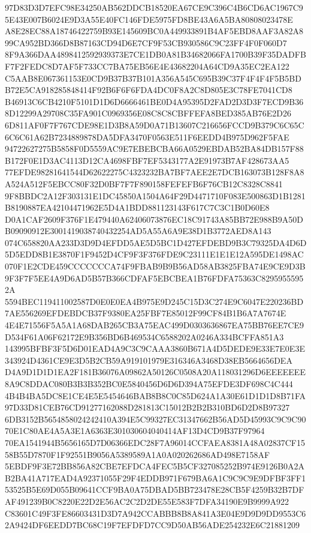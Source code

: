 \documentclass[UTF8,fontset=fandol,zihao=-4,a4paper]{ctexart}
\begin{document}
{{97D83D3D7EFC98E34250AB562DDCB18520EA67CE9C396C4B6CD6AC1967C95E43E007B6024E9D3A55E40FC146FDE5975FD8BE43A6A5BA80808023478E
A8E28EC88A18746422759B93E145609BC0A449933891B4AF5EBD8AAF3A82A899CA952BD366D8B87163CD94D6E7CF9F53CB930586C9C23FF4F0F060D7
8F9A366DAA4898412592939373E7CE1DB0A81B34682066FA1700B39F35DADFBF7F2FEDC8D7AF5F733CC7BA75EB56E4E43682204A64CD9A35EC2EA122
C5AAB8E067361153E0CD9B37B37B101A356A545C695B39C37F4F4F4F5B5BDB72E5CA918285848414F92B6F6F6FDA4DC0F8A2C8D805E3C78FE7041CD8
B46913C6CB4210F5101D1D6D6666461BE0D4A95395D2FAD2D3D3F7ECD9B368D12299A29708C35FA901C0969356E08C8C8CBFFEFA8BED385AB76E2D26
6D811AF0F7F767CDE98E1D3B8A59D0A71B13607C216656FCCD9B379C6C65C6C6C61A62B7234889878DA5DFA3470F0563E511F6EEDD4B975D962F5FAE
94722627275B5858F0D5559AC9E7EBEBCBA66A0529EBDAB52BA84DB157F88B172F0E1D3AC4113D12CA4698FBF7EF5343177A2E91973B7AF428673AA5
77EFDE98281641544D62622275C4323232BA7BF7AEE2E7DCB163073B128F8A8A524A512F5EBCC80F32D0BF7F7F890158FEFEFB6F76CB12C8328C8841
9F8BBDC2A12F303131E1DC45850A1504A64F29D4471710F083E500863D1B1281B8190887EA42104471962E5D4A1BDD881123143F617C7C3C1B0D60E8
D0A1CAF2609F376F1E479440A62406073876EC18C91743A85BB72E988B9A50DB09090912E3001419038740432254AD5A55A6A9E38D1B3772AED8A143
074C658820AA233D3D9D4EFDD5AE5D5BC1D427EFDEBD9B3C79325DA4D6D5D5EDD8B1E3870F1F9452D4CF9F3F376FDE9C23111E1E1E12A595DE1498AC
070F1E2CDE459CCCCCCCA74F9FBAB9B9B56AD58AB3825FBA74E9CE9D3B9F3F7F5EE4A9D6AD5B57B366CDFAF5EBCBEA1B76FDFA75363C82959555952A
5594BEC119411002587D0E0E0EA4B975E9D245C15D3C274E9C6047E220236BD7AE556269EFDEBDCB37F9380EA25FBF7E85012F99CF84B1B6A7A7674E
4E4E71556F5A5A1A68DAB265CB3A75EAC499D0303636867EA75BB76EE7CE9D534F61A06F62172E9B356BD6B469534C6588202A0246A334BCFFA851A3
143995BFBF3F5D6D01EAD4A9C3C9CAAA3860B671A4D5DEDE9E33E7E0E3E343924D4361CE9E3D5B2CB59A919101979E316346A3468D38EB5664656DEA
D4A9D1D1D1EA2F181B36076A09862A50126C0508A20A118031296D6EEEEEEE8A9C8DDAC080B3B3B352BC0E5840456D6D6D394A75EFDE3DF698C4C444
4B4B4BA5DC8E1CE4E5E5454646BAB8B8C0C85D624A1A30E61D1D1D8B71FA97D33D81CEB76CD91277162088D281813C15012B2B2B310BD6D2D8B97327
6DB3152B5654858024242410A394E5C99327EC31347662B56AD5D45993C9C9C9070E1C80AE4A5A3E1A6363E301030604040414AF13D4CD9B37F97964
70EA1541944B5656165D7D06366EDC28F7A96014CCFAEA8381A48A02837CF1558B55D7870F1F92551B9056A5389589A1A0A020262686AD498E7158AF
5EBDF9F3E72BB856A82CBE7EFDCA4FEC5B5CF327085252B974E9126B0A2AB2BA41A717EAD4A92371055F29F4EDDB971F679BA6A1C9C9C9E9DFBF3FF1
53525B5E69D055B09641CCF9BA0A75DBAD5BB723478E28CB5F4259B32B7DFAF491239B0C8220E22D2E56AC2C2D2DE55E583F7DFA34190E9B9999A922
C83601C49F3FE86603431D3D7A942CCABBB8B8A841A3E04E9D9D9DD9553C62A9424DF6EEDD7BC68C19F7EFDFD7CC9D50AB56ADE254232E6C21881209
}}
\end{document}

